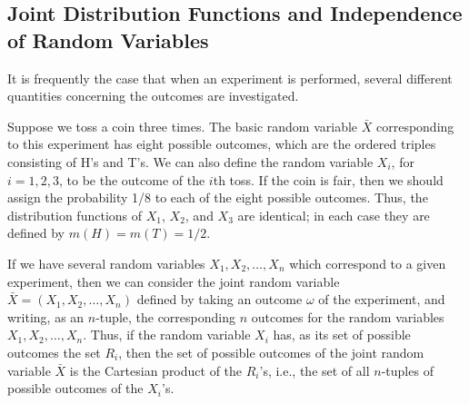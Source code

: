 \subsection*{Joint Distribution Functions and Independence of Random Variables}

It is frequently the case that when an experiment is performed, several different
quantities concerning the outcomes are investigated.  

\begin{example}\label{exam 4.91}
Suppose we toss a coin three times.  The basic random variable ${\bar X}$ corresponding
to this experiment has eight possible outcomes, which are the ordered triples consisting
of H's and T's.  We can also define the random variable $X_i$, for $i = 1, 2, 3$, to be
the outcome of the $i$th toss.  If the coin is fair, then we should assign the probability
1/8 to each of the eight possible outcomes.  Thus, the distribution functions of $X_1$,
$X_2$, and $X_3$ are identical; in each case they are defined by $m(H) = m(T) = 1/2$.
\end{example}

If we have several random variables $X_1, X_2, \ldots, X_n$ which correspond to a given
experiment, then we can consider the joint random variable ${\bar X} = (X_1, X_2,
\ldots, X_n)$ defined by taking an outcome $\omega$ of the experiment, and writing, as an
$n$-tuple, the corresponding $n$ outcomes for the random variables $X_1, X_2, \ldots, X_n$. 
Thus, if the  random variable $X_i$ has, as its set of possible outcomes the set $R_i$, then
the set of possible outcomes of the joint random variable ${\bar X}$ is the Cartesian
product of the $R_i$'s, i.e., the set of all $n$-tuples of possible outcomes of the $X_i$'s.

